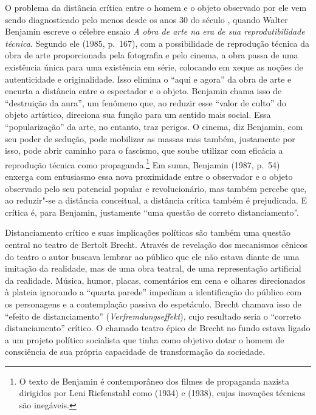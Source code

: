 O problema da distância crítica entre o homem e o objeto observado por
ele vem sendo diagnosticado pelo menos desde os anos 30 do século ,
quando Walter Benjamin escreve o célebre ensaio \emph{A obra de arte na \label{benjamin}
era de sua reprodutibilidade técnica}. Segundo ele (1985, p.~167), com a
possibilidade de reprodução técnica da obra de arte proporcionada pela
fotografia e pelo cinema, a obra passa de uma existência única para uma
existência em série, colocando em xeque as noções de autenticidade e
originalidade. Isso elimina o ``aqui e agora'' da obra de arte e encurta
a distância entre o espectador e o objeto. Benjamin chama isso de
``destruição da aura'', um fenômeno que, ao reduzir esse ``valor de
culto'' do objeto artístico, direciona sua função para um sentido
mais social. Essa ``popularização'' da arte, no entanto, traz perigos. O
cinema, diz Benjamin, com seu poder de sedução, pode mobilizar as massas
mas também, justamente por isso, pode abrir caminho para o fascismo, que
soube utilizar com eficácia a reprodução técnica como
propaganda.\footnote{O texto de Benjamin é contemporâneo dos filmes de
  propaganda nazista dirigidos por Leni Riefenstahl como {} (1934) e {} (1938), cujas inovações técnicas
  são inegáveis.} Em suma, Benjamin (1987, p.~54) enxerga com entusiasmo essa nova
proximidade entre o observador e o objeto observado pelo seu potencial
popular e revolucionário, mas também percebe que, ao reduzir"-se a
distância conceitual, a distância crítica também é prejudicada. E
crítica é, para Benjamin, justamente ``uma questão de
correto distanciamento''.

Distanciamento crítico e suas implicações políticas são também uma \label{brecht}
questão central no teatro de Bertolt Brecht. Através de revelação dos
mecanismos cênicos do teatro o autor buscava lembrar ao público
que ele não estava diante de uma imitação da realidade, mas de uma obra
teatral, de uma representação artificial da realidade. Música, humor,
placas, comentários em cena e olhares direcionados à plateia ignorando a
``quarta parede'' impediam a identificação do público com os personagens
e a contemplação passiva do espetáculo. Brecht chamava isso de
``efeito de distanciamento'' (\emph{Verfremdungseffekt}), cujo resultado \label{verfremdungseffekt}
seria o ``correto distanciamento'' crítico. O chamado teatro épico de
Brecht no fundo estava ligado a um projeto político socialista que tinha
como objetivo dotar o homem de consciência de sua própria capacidade de
transformação da sociedade.

